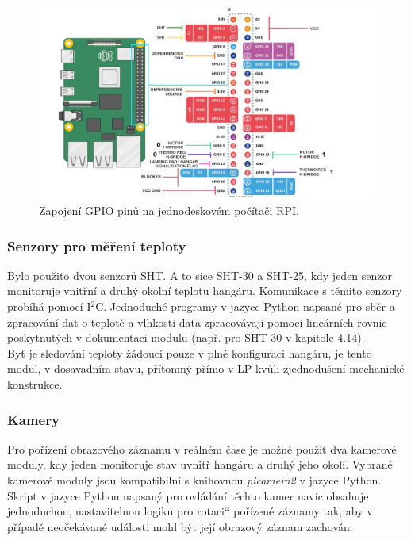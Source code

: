 \documentclass[a4paper]{article}
\newcommand\uvoz[1]{\quotedblbase #1\textquotedblleft}%
\begin{document}
    \begin{figure}[h!]
        \centering
        \includegraphics[width=1\linewidth]{schematics/GPIO_pinout.jpg}
        \caption{Zapojení GPIO pinů na jednodeskovém počítači \acs{RPI}.}
        \label{fig:GPIO}
    \end{figure}

    \subsubsection{Senzory pro měření teploty}
    \label{subsub:sht}
        Bylo použito dvou senzorů SHT. A to sice SHT-30 a SHT-25, kdy jeden senzor monitoruje vnitřní a druhý okolní teplotu hangáru. Komunikace s těmito senzory probíhá pomocí I$^2$C. Jednoduché programy v jazyce Python napsané pro sběr a zpracování dat o teplotě a vlhkosti data zpracovávají pomocí lineárních rovnic poskytnutých v dokumentaci modulu (např. pro \href{https://www.alldatasheet.com/datasheet-pdf/view/1522465/SENSIRION/SHT30-DIS.html}{SHT 30} v kapitole 4.14).\\
    
        \noindent
        Byť je sledování teploty žádoucí pouze v plné konfiguraci hangáru, je tento modul, v dosavadním stavu, přítomný přímo v \acs{LP} kvůli zjednodušení mechanické konstrukce.\\

    \subsubsection{Kamery}
    \label{subsub:cams}
        Pro pořízení obrazového záznamu v reálném čase je možné použít dva kamerové moduly, kdy jeden monitoruje stav uvnitř hangáru a druhý jeho okolí. Vybrané kamerové moduly jsou kompatibilní s knihovnou \textit{picamera2} v jazyce Python. Skript v jazyce Python napsaný pro ovládání těchto kamer navíc obsahuje jednoduchou, nastavitelnou logiku pro \uvoz{rotaci} pořízené záznamy tak, aby v případě neočekávané události mohl být její obrazový záznam zachován.\\
    
\end{document}
